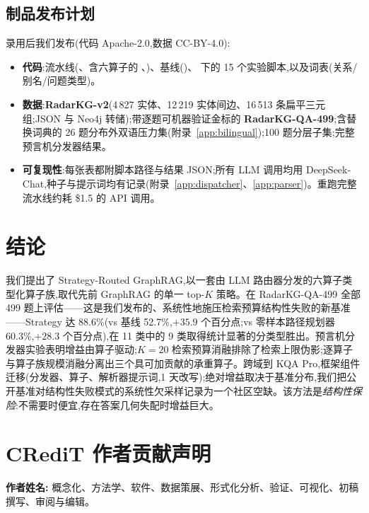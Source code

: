 \documentclass[11pt,a4paper]{article}
\begin{document}
\subsection{制品发布计划}
\label{sec:artifact}

录用后我们发布(代码 Apache-2.0,数据 CC-BY-4.0):
\begin{itemize}[topsep=0pt,itemsep=0pt,leftmargin=*]
  \item \textbf{代码}:流水线(、含六算子的 、)、基线()、 下的 15 个实验脚本,以及词表(关系/别名/问题类型)。
  \item \textbf{数据}:\textbf{RadarKG-v2}(4\,827 实体、12\,219 实体间边、16\,513 条扁平三元组;JSON 与 Neo4j 转储);带逐题可机器验证金标的 \textbf{RadarKG-QA-499};含替换词典的 26 题分布外双语压力集(附录~\ref{app:bilingual});100 题分层子集;完整预言机分发器结果。
  \item \textbf{可复现性}:每张表都附脚本路径与结果 JSON;所有 LLM 调用均用 DeepSeek-Chat,种子与提示词均有记录(附录~\ref{app:dispatcher}、\ref{app:parser})。重跑完整流水线约耗 \$1.5 的 API 调用。
\end{itemize}

\section{结论}
\label{sec:conclusion}

我们提出了 Strategy-Routed GraphRAG,以一套由 LLM 路由器分发的六算子类型化算子族,取代先前 GraphRAG 的单一 top-$K$ 策略。在 RadarKG-QA-499 全部 499 题上评估——这是我们发布的、系统性地施压检索预算结构性失败的新基准——Strategy 达 88.6\%(vs 基线 52.7\%,$+35.9$ 个百分点;vs 零样本路径规划器 60.3\%,$+28.3$ 个百分点),在 11 类中的 9 类取得统计显著的分类型胜出。预言机分发器实验表明增益由算子驱动;$K\!=\!20$ 检索预算消融排除了检索上限伪影;逐算子与算子族规模消融分离出三个具可加贡献的承重算子。跨域到 KQA Pro,框架组件迁移(分发器、算子、解析器提示词,1 天改写);绝对增益取决于基准分布,我们把公开基准对结构性失败模式的系统性欠采样记录为一个社区空缺。该方法是\emph{结构性保险}:不需要时便宜,存在答案几何失配时增益巨大。

\section*{CRediT 作者贡献声明}
\textbf{作者姓名:} 概念化、方法学、软件、数据策展、形式化分析、验证、可视化、初稿撰写、审阅与编辑。
\end{document}
